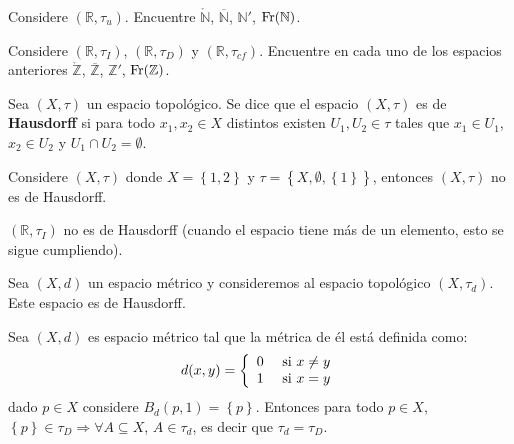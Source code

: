 \documentclass[12pt]{report}
\theoremstyle{largebreak}
\newcommand{\Int}[1]{\ensuremath{\mathring{#1}}}
\newcommand{\Cls}[1]{\ensuremath{\overline{#1}}}
\newcommand{\Fr}[1]{\ensuremath{\textup{Fr}(#1)}}
\begin{document}
    \begin{excer}
        Considere $(\mathbb{R},\tau_u)$. Encuentre $\Int{\mathbb{N}}$, $\Cls{\mathbb{N}}$, $\mathbb{N}'$, $\Fr{\mathbb{N}}$.
    \end{excer}

    \begin{sol}
        
    \end{sol}

    \begin{excer}
        Considere $(\mathbb{R},\tau_I)$, $(\mathbb{R},\tau_D)$ y $(\mathbb{R},\tau_{cf})$. Encuentre en cada uno de los espacios anteriores $\Int{\mathbb{Z}}$, $\Cls{\mathbb{Z}}$, $\mathbb{Z}'$, $\Fr{\mathbb{Z}}$.
    \end{excer}

    \begin{sol}
        
    \end{sol}

    \begin{mydef}
        Sea $(X,\tau)$ un espacio topológico. Se dice que el espacio $(X,\tau)$ es de \textbf{Hausdorff} si para todo $x_1,x_2\in X$ distintos existen $U_1,U_2\in\tau$ tales que $x_1\in U_1$, $x_2\in U_2$ y $U_1\cap U_2=\emptyset$.
    \end{mydef}

    \begin{exa}
        Considere $(X,\tau)$ donde $X=\left\{1,2\right\}$ y $\tau=\left\{X,\emptyset, \left\{1\right\} \right\}$, entonces $(X,\tau)$ no es de Hausdorff.
    \end{exa}

    \begin{exa}
        $(\mathbb{R},\tau_I)$ no es de Hausdorff (cuando el espacio tiene más de un elemento, esto se sigue cumpliendo).
    \end{exa}

    \begin{exa}
        Sea $(X,d)$ un espacio métrico y consideremos al espacio topológico $(X,\tau_d)$. Este espacio es de Hausdorff.
    \end{exa}

    \begin{exa}
        Sea $(X,d)$ es espacio métrico tal que la métrica de él está definida como:
        \begin{equation*}
            d(x,y)=\left\{
            \begin{array}{lr}
                0 & \textup{ si }x\neq y\\
                1 & \textup{ si }x = y\\
            \end{array}
            \right.
        \end{equation*}
        dado $p\in X$ considere $B_d(p,1)=\left\{p\right\}$. Entonces para todo $p\in X$, $\left\{p\right\}\in\tau_D\Rightarrow \forall A\subseteq X$, $A\in\tau_d$, es decir que $\tau_d=\tau_D$. 
    \end{exa}
\end{document}
